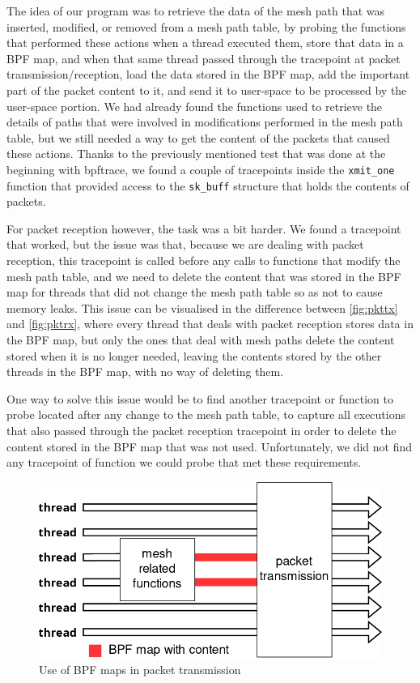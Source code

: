 The idea of our program was to retrieve the data of the mesh path that was
inserted, modified, or removed from a mesh path table, by probing the functions
that performed these actions when a thread executed them, store that data in a
BPF map, and when that same thread passed through the tracepoint at packet
transmission/reception, load the data stored in the BPF map, add the important
part of the packet content to it, and send it to user-space to be processed by
the user-space portion. We had already found the functions used to retrieve the
details of paths that were involved in modifications performed in the mesh path
table, but we still needed a way to get the content of the packets that caused
these actions. Thanks to the previously mentioned test that was done at the
beginning with bpftrace, we found a couple of tracepoints inside the
\texttt{xmit\_one} function that provided access to the \texttt{sk\_buff}
structure that holds the contents of packets.

For packet reception however, the task was a bit harder. We found a tracepoint
that worked, but the issue was that, because we are dealing with packet
reception, this tracepoint is called before any calls to functions that modify
the mesh path table, and we need to delete the content that was stored in the
BPF map for threads that did not change the mesh path table so as not to cause
memory leaks. This issue can be visualised in the difference between
\autoref{fig:pkttx} and \autoref{fig:pktrx}, where every thread that deals with
packet reception stores data in the BPF map, but only the ones that deal with
mesh paths delete the content stored when it is no longer needed, leaving the
contents stored by the other threads in the BPF map, with no way of deleting
them.

One way to solve this issue would be to find another tracepoint or function to
probe located after any change to the mesh path table, to capture all executions
that also passed through the packet reception tracepoint in order to delete the
content stored in the BPF map that was not used. Unfortunately, we did not find
any tracepoint of function we could probe that met these requirements.

\begin{figure}[htb]
   \centering
   \includegraphics[scale=.4]{pktout}
   \caption{Use of BPF maps in packet transmission}\label{fig:pkttx}
\end{figure}

